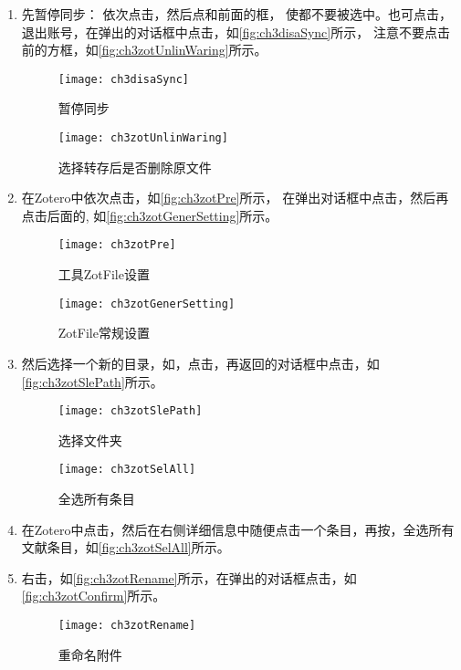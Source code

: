 \documentclass[cn,11pt,chinese]{elegantbook}
\begin{document}
\begin{enumerate}
	\item 先暂停同步：
	依次点击，然后点和前面的框，
	使都不要被选中。也可点击，退出账号，在弹出的对话框中点击，如\autoref{fig:ch3disaSync}所示，
	注意不要点击前的方框，如\autoref{fig:ch3zotUnlinWaring}所示。

		\begin{figure}[htbp]
			\centering
			\texttt{[image: ch3disaSync]}
			\caption{暂停同步}
			\label{fig:ch3disaSync}
		\end{figure}
	
		\begin{figure}[htbp]
			\centering
			\texttt{[image: ch3zotUnlinWaring]}
			\caption{选择转存后是否删除原文件}
			\label{fig:ch3zotUnlinWaring}
		\end{figure}
\item 在Zotero中依次点击，如\autoref{fig:ch3zotPre}所示，
在弹出对话框中点击，然后再点击后面的,
如\autoref{fig:ch3zotGenerSetting}所示。

		\begin{figure}[htbp]
			\centering
			\texttt{[image: ch3zotPre]}
			\caption{工具ZotFile设置}
			\label{fig:ch3zotPre}
		\end{figure}
	
		\begin{figure}[htbp]
			\centering
			\texttt{[image: ch3zotGenerSetting]}
			\caption{ZotFile常规设置}
			\label{fig:ch3zotGenerSetting}
		\end{figure}
\item 然后选择一个新的目录，如，点击，再返回的对话框中点击，如\autoref{fig:ch3zotSlePath}所示。
		\begin{figure}[htbp]
			\centering
			\texttt{[image: ch3zotSlePath]}
			\caption{选择文件夹}
			\label{fig:ch3zotSlePath}
		\end{figure}
	
		\begin{figure}[htbp]
			\centering
			\texttt{[image: ch3zotSelAll]}
			\caption{全选所有条目}
			\label{fig:ch3zotSelAll}
		\end{figure}
\item 在Zotero中点击，然后在右侧详细信息中随便点击一个条目，再按，全选所有文献条目，如\autoref{fig:ch3zotSelAll}所示。
\item 右击，如\autoref{fig:ch3zotRename}所示，在弹出的对话框点击，如\autoref{fig:ch3zotConfirm}所示。
		\begin{figure}[htbp]
			\centering
			\texttt{[image: ch3zotRename]}
			\caption{重命名附件}
			\label{fig:ch3zotRename}
		\end{figure}
	

\end{enumerate}
\end{document}
